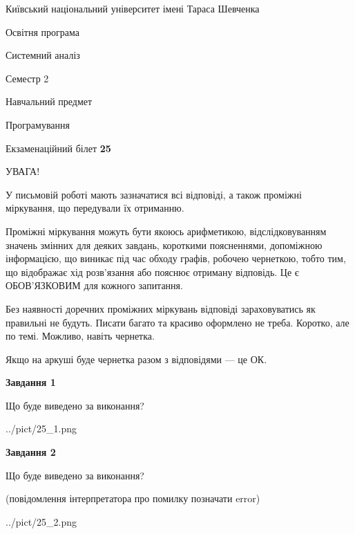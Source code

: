 \documentclass[12pt, ukrainian]{article}
\begin{document}
{{\begin {small}\par
{ \center  Київський національний університет імені Тараса Шевченка \par}
{\parbox {5 cm}{Освітня програма \hfill}{\parbox {7 cm}{Системний аналіз \hfill}}\parbox {6 cm}{\hfill Семестр 2}}\par
{\parbox {5 cm} {Навчальний предмет \hfill}\parbox {7 cm}{Програмування \hfill}\parbox {6cm}{\hfill}\par}\vspace{-7pt} \end{small}}{\center Екзаменаційний білет \No \textbf
{ 25 }\par}}
{
\begin {large}
УВАГА!

У письмовій роботі мають зазначатися всі відповіді, а також проміжні міркування, що передували їх отриманню.

Проміжні міркування можуть бути якоюсь арифметикою, відслідковуванням зна\-чень змінних для деяких завдань,
короткими поясненнями, допоміжною інформацією, що виникає під час обходу графів, робочею чернеткою,
тобто тим, що відображає хід розв’язання або пояснює отриману відповідь.
Це є ОБОВ’ЯЗКОВИМ для кожного запитання.

Без наявності доречних проміжних міркувань відповіді зараховуватись як правиль\-ні не будуть.
Писати багато та красиво оформлено не треба. Коротко, але по темі. Можли\-во, навіть чернетка.

Якщо на аркуші буде чернетка разом з відповідями --- це ОК.

\newpage

{\begin {center}\textbf{Завдання 1}\end {center}}\par
Що буде виведено за виконання?\par
\begin{center}
	{../pict/25_1.png}
\end{center}
\newpage

{\begin {center}\textbf{Завдання 2}\end {center}}\par
Що буде виведено за виконання?\par
 (повідомлення інтерпретатора про помилку позначати error)\par
\begin{center}
	{../pict/25_2.png}
\end{center}
\newpage


\end{large}}
\end{document}
